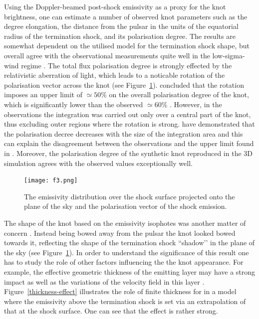 Using the Doppler-beamed post-shock emissivity as a proxy for the knot brightness, one can estimate a number of observed  knot parameters such as the degree elongation, the distance from the pulsar in the units of the equatorial radius of the termination shock, and its polarisation degree.     The results are somewhat dependent on the  utilised model for the termination shock shape, but overall agree with the observational measurements quite well in the low-sigma-wind regime .  
The total flux polarisation degree is strongly effected by the relativistic aberration of light, which leads to a noticable rotation of the polarisation vector across the knot (see Figure~\ref{knot-polarisation}).  \citet{YB-15} concluded that the rotation imposes an upper limit 
of $\simeq 50\%$ on the overall polarisation degree of the knot, which is significantly lower than the observed $\simeq 60\%$ .  However, in the observations the integration was carried out only over a central part of the knot, thus excluding outer regions where the rotation is strong. \citep{LKP-16} have demonstrated that the polarisation decree decreases with the size of the integration area and this can explain the disagreement  between the observations and the upper limit found  in \citep{YB-15}.      
Moreover, the polarisation degree of the synthetic knot reproduced in the 3D simulation \citep{} agrees with the observed values exceptionally well. 

\begin{figure}[h!]
\begin{center}
\texttt{[image: f3.png]}
\caption{The emissivity distribution over the shock surface projected onto the plane of the sky and the polarisation vector of the shock emission. 
}
\end{center}
\label{knot-polarisation}
\end{figure}

The shape of the knot based on the emissivity isophotes was another matter of concern \citep{YB-15}. Instead being bowed away from the pulsar the knot looked bowed towards it, reflecting the shape of the termination shock ``shadow’’ in the plane of the sky (see Figure~\ref{knot-polarisation}). In order to understand the significance of this result one has to study the role of other factors influencing the the knot appearance. For example,  the effective geometric thickness of the emitting layer may have a strong impact as well as the variations of the velocity field in this layer \citep{LKP-16,YB-15}.  Figure~\ref{thickness-effect} illustrates the role of finite thickness for in a model where the emissivity above the termination shock is set via an extrapolation of that at the shock surface\citep{LKP-16}. One can see that the effect is rather strong.    

